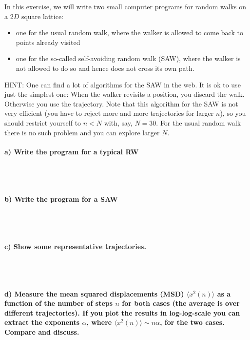 In this exercise, we will write two small computer programs for random
walks on a $2D$ square lattice:
\begin{itemize}
    \item one for the usual random walk, where the walker is allowed to 
        come back to points already visited
    \item one for the so-called self-avoiding random walk (SAW), 
        where the walker is not allowed to do so and hence does not 
        cross its own path.
\end{itemize}
HINT: One can find a lot of algorithms for the SAW in the web. It is ok 
to use just the simplest one: When the walker revisits a position, you 
discard the walk. Otherwise you use the trajectory. Note that this 
algorithm for the SAW is not very efficient (you have to reject more 
and more trajectories for larger $n$), so you should restrict yourself 
to $n<N$ with, say, $N=30$. For the usual random walk there is no such 
problem and you can explore larger $N$.

\paragraph{a) Write the program for a typical RW} \ \\
\\

\paragraph{b) Write the program for a SAW} \ \\
\\

\paragraph{c) Show some representative trajectories.} \ \\
\\

\paragraph{d) Measure the mean squared displacements (MSD) 
    $\langle x^2(n)\rangle$ as a function of the number of steps $n$ 
    for both cases (the average is over different trajectories). If you 
    plot the results in log-log-scale you can extract the exponents 
    $\alpha$, where $\langle x^2(n)\rangle\sim n\alpha$, for the two 
    cases. Compare and discuss.
} \ \\
\\

